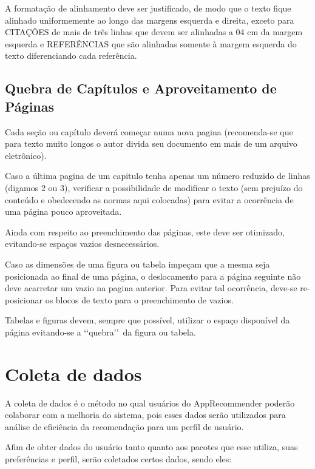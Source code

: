 A formatação de alinhamento deve ser justificado, de modo que o texto fique
alinhado uniformemente ao longo das margens esquerda e direita, exceto para
CITAÇÕES de mais de três linhas que devem ser alinhadas a 04 cm da margem
esquerda e REFERÊNCIAS que são alinhadas somente à margem esquerda do texto
diferenciando cada referência.

\subsection{Quebra de Capítulos e Aproveitamento de Páginas}

Cada seção ou capítulo deverá começar numa nova pagina (recomenda-se que
para texto muito longos o autor divida seu documento em mais de um arquivo
eletrônico).

Caso a última pagina de um capitulo tenha apenas um número reduzido de
linhas (digamos 2 ou 3), verificar a possibilidade de modificar o texto
(sem prejuízo do conteúdo e obedecendo as normas aqui colocadas) para
evitar a ocorrência de uma página pouco aproveitada.

Ainda com respeito ao preenchimento das páginas, este deve ser otimizado,
evitando-se espaços vazios desnecessários.

Caso as dimensões de uma figura ou tabela impeçam que a mesma seja
posicionada ao final de uma página, o deslocamento para a página seguinte
não deve acarretar um vazio na pagina anterior. Para evitar tal ocorrência,
deve-se re-posicionar os blocos de texto para o preenchimento de vazios.

Tabelas e figuras devem, sempre que possível, utilizar o espaço disponível
da página evitando-se a \lq\lq quebra\rq\rq\ da figura ou tabela.

\section{Coleta de dados}

A coleta de dados é o método no qual usuários do AppRecommender poderão
colaborar com a melhoria do sistema, pois esses dados serão utilizados para
análise de eficiência da recomendação para um perfil de usuário.

Afim de obter dados do usuário tanto quanto aos pacotes que esse utiliza,
suas preferências e perfil, serão coletados certos dados, sendo eles:


